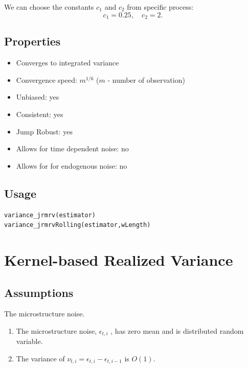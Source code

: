 \documentclass[letterpaper]{report}
\begin{document}
We can choose the constants $c_1$ and $c_2$ from specific process:
\begin{equation}
c_1 = 0.25, \quad
c_2 = 2.
\end{equation}
\subsection{Properties}
\begin{itemize}
\item Converges to integrated variance
\item Convergence speed: $m^{1/6}$ ($m$ - number of observation)
\item Unbiased: yes
\item Consistent: yes
\item Jump Robust: yes
\item Allows for time dependent noise: no
\item Allows for for endogenous noise: no
\end{itemize}
  \subsection{Usage}
\begin{lstlisting}
variance_jrmrv(estimator)
variance_jrmrvRolling(estimator,wLength)
\end{lstlisting}

\section{Kernel-based Realized Variance}
\subsection{Assumptions}
The microstructure noise.
\begin{enumerate}
\item The microstructure noise, $\epsilon_{t,i}$ , has zero mean and is distributed random variable.
\item The variance of $\nu_{t,i} = \epsilon_{t,i} - \epsilon_{t,i-1}$ is
$O(1)$.
\end{enumerate}
\end{document}
